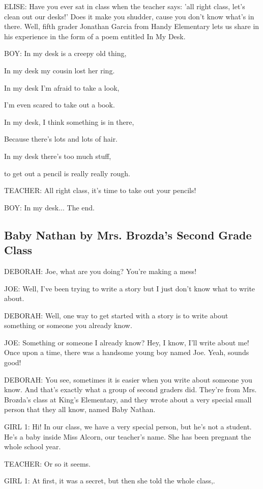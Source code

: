 ELISE:
Have you ever sat in class when the teacher says: 'all right class, let's clean out our desks!'
Does it make you shudder, cause you don't know what's in there.
Well, fifth grader Jonathan Garcia from Handy Elementary lets us share in his experience in the form of a poem entitled In My Desk.

BOY:
In my desk is a creepy old thing,

In my desk my cousin lost her ring.

In my desk I'm afraid to take a look,

I'm even scared to take out a book.

In my desk, I think something is in there,

Because there's lots and lots of hair.

In my desk there's too much stuff,

to get out a pencil is really really rough.

TEACHER:
All right class, it's time to take out your pencils!

BOY:
In my desk... The end.

\subsection{Baby Nathan by Mrs. Brozda's Second Grade Class}

DEBORAH:
Joe, what are you doing?
You're making a mess!

JOE:
Well, I've been trying to write a story but I just don't know what to write about.

DEBORAH:
Well, one way to get started with a story is to write about something or someone you already know.

JOE:
Something or someone I already know?
Hey, I know, I'll write about me!
Once upon a time, there was a handsome young boy named Joe.
Yeah, sounds good!

DEBORAH:
You see, sometimes it is easier when you write about someone you know.
And that's exactly what a group of second graders did.
They're from Mrs. Brozda's class at King's Elementary, and they wrote about a very special small person that they all know, named Baby Nathan.

GIRL 1:
Hi!
In our class, we have a very special person, but he's not a student.
He's a baby inside Miss Alcorn, our teacher's name.
She has been pregnant the whole school year.

TEACHER:
Or so it seems.

GIRL 1:
At first, it was a secret, but then she told the whole class,.

